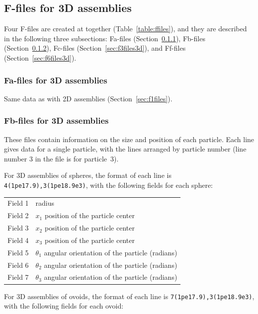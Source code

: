 \documentclass[letterpaper,11pt]{article}
\begin{document}
\subsection{F-files for 3D assemblies}\label{sec:ffiles3d}
Four F-files are created at together (Table~\ref{table:ffiles}),
and they are described in the following three subsections:
Fa-files (Section~\ref{sec:f1files3d}),
Fb-files (Section~\ref{sec:f2files3d}),
Fc-files (Section~\ref{sec:f3files3d}),
and Ff-files (Section~\ref{sec:f6files3d}).

\subsubsection{Fa-files for 3D assemblies}\label{sec:f1files3d}
Same data as with 2D assemblies (Section~\ref{sec:f1files}).
%
\subsubsection{Fb-files for 3D assemblies}\label{sec:f2files3d}
These files contain information on the size and position of each particle.
Each line gives data for a single particle, with the
lines arranged by particle number (line number 3 in the file is 
for particle~3).
\par
For 3D assemblies of spheres,
the format of each line is \texttt{4(1pe17.9),3(1pe18.9e3)}, with
the following fields 
for each sphere:\\
\begin{center}
\begin{tabular}{lp{3.5in}}
Field 1 & radius \\
Field 2 & $x_{1}$ position of the particle center\\
Field 3 & $x_{2}$ position of the particle center\\
Field 4 & $x_{3}$ position of the particle center\\
Field 5 & $\theta_{1}$ angular orientation of the particle (radians)\\
Field 6 & $\theta_{2}$ angular orientation of the particle (radians)\\
Field 7 & $\theta_{3}$ angular orientation of the particle (radians)
\end{tabular}
\end{center}
\par
For 3D assemblies of ovoids,
the format of each line is \texttt{7(1pe17.9),3(1pe18.9e3)}, with
the following fields
for each ovoid:\\
\end{document}

